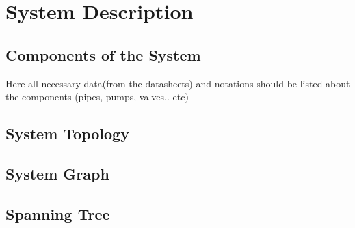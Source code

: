\chapter{System Description}
\label{system_description}

\section{Components of the System}
\label{systemcomponents}

Here all necessary data(from the datasheets) and notations should be listed about the components (pipes, pumps, valves.. etc) 

\section{System Topology}
\label{systemdiagram}
\begin{figure}[H]
\centering
\resizebox{0.75\linewidth}{!}{}
% 
\label{systemdiagram}
\end{figure}

\section{System Graph}
\label{systemgraph}
\begin{figure}[H]
\centering
% 
\resizebox{1\linewidth}{!}{}
\end{figure}

\section{Spanning Tree}
\label{spanningtree}
\begin{figure}[H]
\centering
% 
\resizebox{0.9\linewidth}{!}{}
\end{figure}


